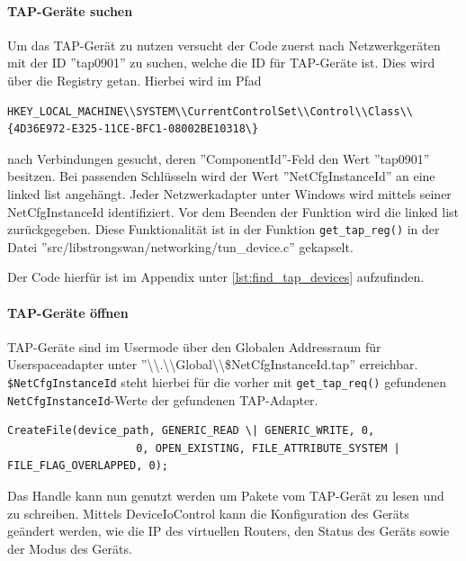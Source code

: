 {\paragraph{TAP-Geräte suchen}
Um das TAP-Gerät zu nutzen versucht der Code zuerst nach Netzwerkgeräten mit der ID ''tap0901'' zu suchen,
welche die ID für TAP-Geräte ist. Dies wird über die Registry getan. Hierbei wird
im Pfad \begin{lstlisting}[numbers=none]
HKEY_LOCAL_MACHINE\\SYSTEM\\CurrentControlSet\\Control\\Class\\{4D36E972-E325-11CE-BFC1-08002BE10318\}
\end{lstlisting}
nach Verbindungen gesucht, deren ''ComponentId''-Feld den Wert ''tap0901'' besitzen.
Bei passenden Schlüsseln wird der Wert ''NetCfgInstanceId'' an eine linked list
angehängt. Jeder Netzwerkadapter unter Windows wird mittels seiner NetCfgInstanceId identifiziert.
Vor dem Beenden der Funktion wird die linked list zurückgegeben.
Diese Funktionalität ist in der Funktion \texttt{get\_tap\_reg()} in der Datei
''src/libstrongswan/networking/tun\_device.c'' gekapselt.

Der Code hierfür ist im Appendix unter \autoref{lst:find_tap_devices} aufzufinden.

\paragraph{TAP-Geräte öffnen}
TAP-Geräte sind im Usermode über den Globalen Addressraum für Userspaceadapter
unter ''\textbackslash{}\textbackslash{}.\textbackslash{}\textbackslash{}Global\textbackslash{}\textbackslash{}\$NetCfgInstanceId.tap'' erreichbar.
\texttt{\$NetCfgInstanceId} steht hierbei für die vorher mit \texttt{get\_tap\_req()} gefundenen
\texttt{NetCfgInstanceId}-Werte der gefundenen TAP-Adapter.

\begin{lstlisting}[numbers=none]
CreateFile(device_path, GENERIC_READ \| GENERIC_WRITE, 0,
                    0, OPEN_EXISTING, FILE_ATTRIBUTE_SYSTEM | FILE_FLAG_OVERLAPPED, 0);
\end{lstlisting}

Das Handle kann nun genutzt werden um Pakete vom TAP-Gerät zu lesen und zu schreiben.
Mittels DeviceIoControl kann die Konfiguration des Geräts geändert werden,
wie die IP des virtuellen Routers, den Status des Geräts sowie der Modus des Geräts.

}
